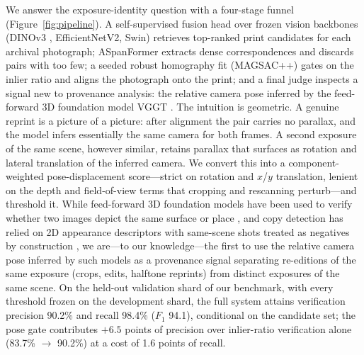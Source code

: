\documentclass[letterpaper]{article} %
\begin{document}
We answer the exposure-identity question with a four-stage funnel
(Figure~\ref{fig:pipeline}). A self-supervised fusion head over frozen vision
backbones (DINOv3 \cite{simeoni2025dinov3}, EfficientNetV2, Swin) retrieves
top-ranked print candidates for each archival photograph; ASpanFormer
\cite{chen2022aspanformer} extracts dense correspondences and discards pairs
with too few; a seeded robust homography fit (MAGSAC++) gates on the inlier
ratio and aligns the photograph onto the print; and a final judge inspects a
signal new to
provenance analysis: the relative camera pose inferred by the feed-forward 3D
foundation model VGGT \cite{wang2025vggt}. The intuition is geometric. A
genuine reprint is a picture of a picture: after alignment the pair carries no
parallax, and the model infers essentially the same camera for both frames. A
second exposure of the same scene, however similar, retains parallax that
surfaces as rotation and lateral translation of the inferred camera. We
convert this into a component-weighted pose-displacement score---strict on
rotation and $x$/$y$ translation, lenient on the depth and field-of-view terms
that cropping and rescanning perturb---and threshold it. While feed-forward 3D
foundation models have been used to verify whether two images depict the same
surface or place
\cite{cai2023doppelgangers,xiangli2025doppelgangerspp,maggio2026vggtslam},
and copy detection has relied on 2D appearance descriptors with same-scene
shots treated as negatives by construction
\cite{douze2021disc,pizzi2022sscd,wang2023ndec}, we are---to our
knowledge---the first to use the relative camera pose inferred by such models
as a provenance signal separating re-editions of the same exposure (crops,
edits, halftone reprints) from distinct exposures of the same scene. On the
held-out validation shard of our benchmark, with every threshold frozen on the
development shard, the full system attains verification precision 90.2\% and
recall 98.4\% ($F_1$ 94.1), conditional on the candidate set; the pose gate
contributes $+6.5$ points of precision over inlier-ratio verification alone
(83.7\% $\rightarrow$ 90.2\%) at a cost of 1.6 points of recall.
\end{document}
